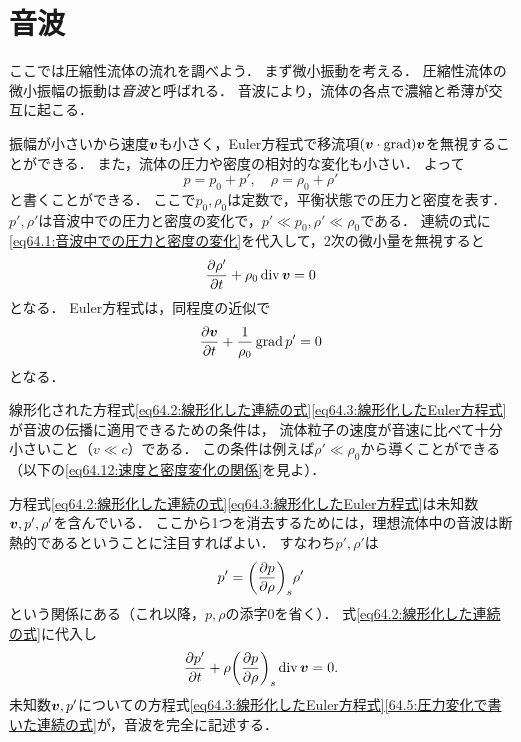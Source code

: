 \section{音波}

ここでは圧縮性流体の流れを調べよう．
まず微小振動を考える．
圧縮性流体の微小振幅の振動は\emph{音波}と呼ばれる．
音波により，流体の各点で濃縮と希薄が交互に起こる．


振幅が小さいから速度$\vb*{v}$も小さく，Euler方程式で移流項$(\vb*{v}\cdot\operatorname{grad})\vb*{v}$を無視することができる．
また，流体の圧力や密度の相対的な変化も小さい．
よって
\begin{equation}\label{eq64.1:音波中での圧力と密度の変化}
    p = p_0 + p', \quad \rho = \rho_0 + \rho'
\end{equation}
と書くことができる．
ここで$p_0, \rho_0$は定数で，平衡状態での圧力と密度を表す．
$p', \rho'$は音波中での圧力と密度の変化で，$p' \ll p_0, \rho' \ll \rho_0$である．
連続の式に\eqref{eq64.1:音波中での圧力と密度の変化}を代入して，2次の微小量を無視すると
\begin{equation}\label{eq64.2:線形化した連続の式}
    \pdv{\rho'}{t} + \rho_0 \operatorname{div}\vb*{v} = 0
\end{equation}
となる．
Euler方程式は，同程度の近似で
\begin{equation}\label{eq64.3:線形化したEuler方程式}
    \pdv{\vb*{v}}{t} + \frac{1}{\rho_0} \operatorname{grad} p' = 0
\end{equation}
となる．


線形化された方程式\eqref{eq64.2:線形化した連続の式}\eqref{eq64.3:線形化したEuler方程式}が音波の伝播に適用できるための条件は，
流体粒子の速度が音速に比べて十分小さいこと（$v \ll c$）である．
この条件は例えば$\rho' \ll \rho_0$から導くことができる（以下の\eqref{eq64.12:速度と密度変化の関係}を見よ）．


方程式\eqref{eq64.2:線形化した連続の式}\eqref{eq64.3:線形化したEuler方程式}は未知数$\vb*{v}, p', \rho'$を含んでいる．
ここから1つを消去するためには，理想流体中の音波は断熱的であるということに注目すればよい．
すなわち$p', \rho'$は
\begin{equation}\label{eq64.4:圧力変化と密度変化の関係}
    p' = \PDV{p}{\rho}{s} \rho'
\end{equation}
という関係にある（これ以降，$p,\rho$の添字0を省く）．
式\eqref{eq64.2:線形化した連続の式}に代入し
\begin{equation}\label{64.5:圧力変化で書いた連続の式}
    \pdv{p'}{t} + \rho \PDV{p}{\rho}{s} \Div \v = 0.
\end{equation}
未知数$\vb*{v},p'$についての方程式\eqref{eq64.3:線形化したEuler方程式}\eqref{64.5:圧力変化で書いた連続の式}が，音波を完全に記述する．


